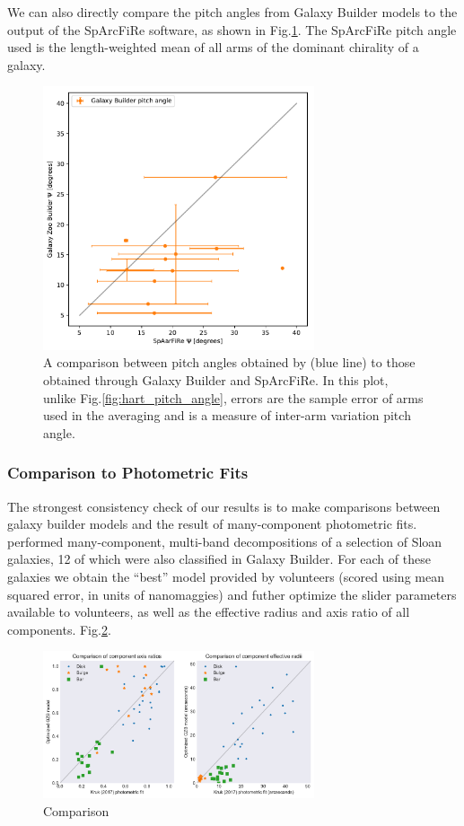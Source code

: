 \documentclass[../main.tex]{subfiles}
\begin{document}
We can also directly compare the pitch angles from Galaxy Builder models to the output of the SpArcFiRe software, as shown in Fig.\ref{fig:sparcfire_pitch_angle}. The SpArcFiRe pitch angle used is the length-weighted mean of all arms of the dominant chirality of a galaxy.

\begin{figure}
  \includegraphics[width=8cm]{images__results/pitch-angle-comparison2.pdf}
  \caption{A comparison between pitch angles obtained by \citet{Hart2016:1607.01019v1} (blue line) to those obtained through Galaxy Builder and SpArcFiRe. In this plot, unlike Fig.\ref{fig:hart_pitch_angle}, errors are the sample error of arms used in the averaging and is a measure of inter-arm variation pitch angle.}
  \label{fig:sparcfire_pitch_angle}
\end{figure}


\subsubsection{Comparison to Photometric Fits}
The strongest consistency check of our results is to make comparisons between galaxy builder models and the result of many-component photometric fits. \citet{Kruk2017:1710.00093v2} performed many-component, multi-band decompositions of a selection of Sloan galaxies, 12 of which were also classified in Galaxy Builder. For each of these galaxies we obtain the ``best'' model provided by volunteers (scored using mean squared error, in units of nanomaggies) and futher optimize the slider parameters available to volunteers, as well as the effective radius and axis ratio of all components. Fig.\ref{fig:sd_comp_comparison}.

\begin{figure}
  \includegraphics[width=8cm]{images__results/sd_comp_comparison.pdf}
  \caption{Comparison }
  \label{fig:sd_comp_comparison}
\end{figure}
\end{document}
